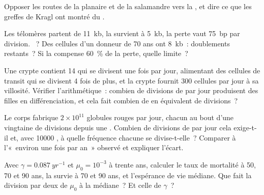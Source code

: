 \begin{exercise}[$\star$]\label{exo:b3:stem-cells:4}
Opposer les routes de la planaire et de la salamandre vers la
, et dire ce que les greffes de Kragl ont montré du .
\end{exercise}

\begin{exercise}[$\star\star$]\label{exo:b3:stem-cells:5}
Les télomères partent de \qty{11}{kb}, la  survient à
\qty{5}{kb}, la perte vaut \qty{75}{bp} par division. ~? Des cellules d'un donneur de 70 ans ont \qty{8}{kb}~:
doublements restants~? Si la  compense \qty{60}{\%} de la
perte, quelle limite~?
\end{exercise}

\begin{exercise}[$\star\star$]\label{exo:b3:stem-cells:6}
Une crypte contient 14  qui se divisent une fois par
jour, alimentant des cellules de transit qui se divisent 4 fois de plus,
et la crypte fournit \num{300} cellules par jour à sa villosité.
Vérifier l'arithmétique~: combien de divisions de  par
jour produisent des filles en différenciation, et cela fait combien de
 en équivalent de divisions~?
\end{exercise}

\begin{exercise}[$\star\star$]\label{exo:b3:stem-cells:7}
Le corps fabrique $2\times 10^{11}$ globules rouges par jour, chacun au
bout d'une vingtaine de divisions depuis une . Combien de
divisions de  par jour cela exige-t-il et, avec
\num{10000} , à quelle fréquence chacune se divise-t-elle~?
Comparer à l'«~environ une fois par an~» observé et expliquer l'écart.
\end{exercise}

\begin{exercise}[$\star\star$]\label{exo:b3:stem-cells:8}
Avec $\gamma = \qty{0.087}{yr^{-1}}$ et $\mu_{0} = 10^{-3}$ à trente
ans, calculer le taux de mortalité à 50, 70 et 90 ans, la survie à 70 et
90 ans, et l'espérance de vie médiane. Que fait la division par deux de
$\mu_{0}$ à la médiane~? Et celle de $\gamma$~?
\end{exercise}

